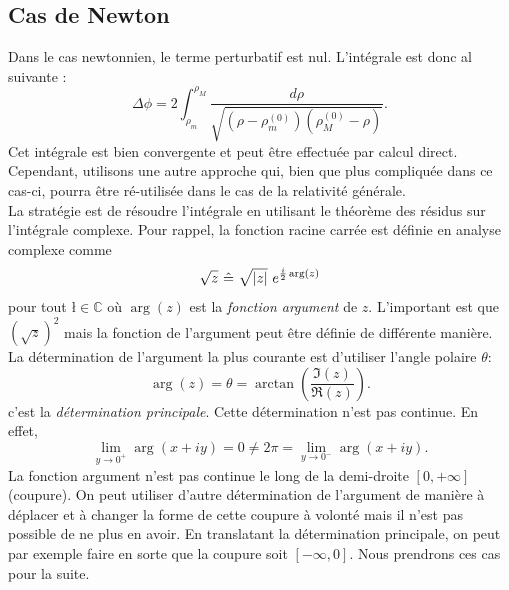\documentclass[a4paper,11pt]{report}
\begin{document}
        \subsection{Cas de Newton}
        
            Dans le cas newtonnien, le terme perturbatif est nul. L'intégrale est donc al suivante :
            \begin{equation}
                \Delta\phi = 2\int^{\rho_M}_{\rho_m}\frac{d\rho}{\sqrt{\left( \rho-\rho^{(0)}_m \right)\left( \rho^{(0)}_M-\rho \right)}}.
            \end{equation}
            Cet intégrale est bien convergente et peut être effectuée par calcul direct. Cependant, utilisons une autre approche qui, bien que plus compliquée dans ce cas-ci, pourra être ré-utilisée dans le cas de la relativité générale.\\
            
            La stratégie est de résoudre l'intégrale en utilisant le théorème des résidus sur l'intégrale complexe. Pour rappel, la fonction racine carrée est définie en analyse complexe comme
            \begin{equation}
                \sqrt{z}~\hat{=}~\sqrt{\abs{z}}~e^{\frac{i}{2}\arg(z)}
            \end{equation}
            pour tout $ł\in\mathbb{C}$ où $\arg(z)$ est la \textit{fonction argument} de $z$. L'important est que $(\sqrt{z})^2$ mais la fonction de l'argument peut être définie de différente manière. La détermination de l'argument la plus courante est d'utiliser l'angle polaire $\theta$:
            \begin{equation}
                \arg(z) = \theta = \arctan\left(\frac{\Im(z)}{\Re(z)}\right).
            \end{equation}
            c'est la \textit{détermination principale}. Cette détermination n'est pas continue. En effet, 
            \begin{equation}
                \lim\limits_{y\to0^+} \arg(x+iy) = 0 \neq 2\pi = \lim\limits_{y\to0^-} \arg(x+iy).
            \end{equation}
            La fonction argument n'est pas continue le long de la demi-droite $[0,+\infty]$ (coupure). On peut utiliser d'autre détermination de l'argument de manière à déplacer et à changer la forme de cette coupure à volonté mais il n'est pas possible de ne plus en avoir. En translatant la détermination principale, on peut par exemple faire en sorte que la coupure soit $[-\infty,0]$. Nous prendrons ces cas pour la suite.
            
\end{document}

